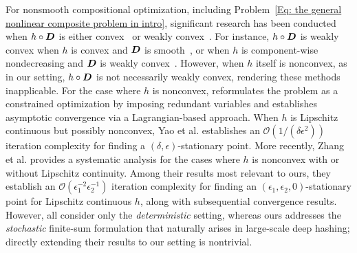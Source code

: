 
For nonsmooth compositional optimization, including Problem~\eqref{Eq: the general nonlinear composite problem in intro}, significant research has been conducted when \(h\circ \bm{D}\) is either convex~\cite{zhang2020optimal,wang2024alexr} or weakly convex~\cite{davis2019,Drusvyatskiy2019,wang2024,hu23}. {For instance, \(h\circ \bm{D}\) is weakly convex when \(h\) is convex and \(\bm{D}\) is smooth~\cite{davis2019,Drusvyatskiy2019,wang2024}, or when \(h\) is component-wise nondecreasing and \(\bm{D}\) is weakly convex~\cite{hu23}.} However, when $h$ itself is nonconvex, as in our setting, $h \circ \bm{D}$ is not necessarily weakly convex, rendering these methods inapplicable. For the case where $h$ is nonconvex, \cite{Bolte2018} reformulates the problem as a constrained optimization by imposing redundant variables and establishes asymptotic convergence via a Lagrangian-based approach. 
{When \(h\) is Lipschitz continuous but possibly nonconvex, Yao et al.\cite{yao2024note} establishes an \(\mathcal{O}(1/(\delta\epsilon^2))\) iteration complexity for finding a \((\delta,\epsilon)\)-stationary point. More recently,  Zhang et al.\cite{zhang2025complexity} provides a systematic analysis for the cases where \(h\) is nonconvex with or without Lipschitz continuity.} Among their results most relevant to ours, they establish an $\mathcal{O}(\epsilon_1^{-2} \epsilon_2^{-1})$ iteration complexity for finding an $(\epsilon_1, \epsilon_2, 0)$-stationary point for Lipschitz continuous $h$, along with subsequential convergence results. However, all consider only the \emph{deterministic} setting, whereas ours addresses the \emph{stochastic} finite-sum formulation that naturally arises in large-scale deep hashing; directly extending their results to our setting is nontrivial.
